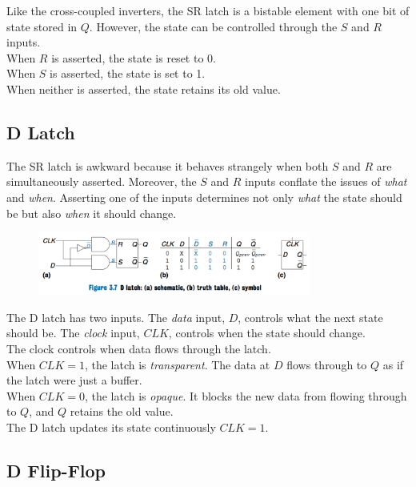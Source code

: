 \documentclass[12pt]{article}
\theoremstyle{definition}
\begin{document}
  Like the cross-coupled inverters, the SR latch is a bistable element with one bit of state stored in $Q$.
  However, the state can be controlled through the $S$ and $R$ inputs. \\
  When $R$ is asserted, the state is reset to 0. \\
  When $S$ is asserted, the state is set to 1. \\
  When neither is asserted, the state retains its old value.

  \subsection{D Latch}
  The SR latch is awkward because it behaves strangely when both $S$ and $R$ are simultaneously asserted.
  Moreover, the $S$ and $R$ inputs conflate the issues of \emph{what} and \emph{when}.
  Asserting one of the inputs determines not only \emph{what} the state should be but also \emph{when} it should change. \\

  \begin{figure}
    \centering
    \includegraphics[width=0.8\textwidth]{pictures/dLatch.png}
  \end{figure}
  The D latch has two inputs.
  The \emph{data} input, $D$, controls what the next state should be.
  The \emph{clock} input, $CLK$, controls when the state should change. \\
  The clock controls when data flows through the latch. \\
  When $CLK = 1$, the latch is \emph{transparent}.
  The data at $D$ flows through to $Q$ as if the latch were just a buffer. \\
  When $CLK = 0$, the latch is \emph{opaque}.
  It blocks the new data from flowing through to $Q$, and $Q$ retains the old value. \\
  The D latch updates its state continuously $CLK = 1$.

  \subsection{D Flip-Flop}
\end{document}
